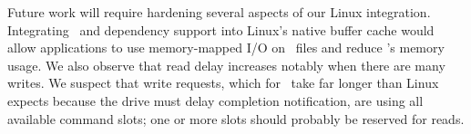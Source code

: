 \begin{comment}
The Linux kernel must be modified in order to
provide support for \patchgroups.  As a kernel module, there is no way to
get notifications about when processes are created, or when they terminate; this
is necessary to clone the \patchgroup\ scope 
from the parent process when the process is created, and to release all
the \patchgroups\ when it terminates. Ordinarily, this sort of state would be kept
as part of the Linux \texttt{task\_struct} (i.e. process) structure, but this is
not a viable option for a dynamically loadable kernel module. Instead, the
\Kudos\ module keeps this state internally and uses new kernel hooks
to be notified when processes fork or exit. 

Our interfaces bypass all Linux caches, because \Kudos\ provides its own
\patch-aware caches (\S\ref{sec:modules:wbcache}) in order to provide its
write-ordering guarantees.

Our current implementation uses Linux's queuing structures for queuing I/O
requests for block devices. Although this is working, there are a couple subtle
problems that we would like to solve in a future version. For instance, we would
like to be able to give more priority to read requests, potentially even
reserving a SCSI TCQ or SATA NCQ command tag for reads only. In the current
implementation, read delay increases noticeably when there are many writes; we
suspect that a factor in this behavior is that the command tags are typically
all used for outstanding writes (since we request that the commands complete
only after the physical media has been written), while the Linux queues are
designed for a different situation: writes complete quickly (to the disk's
cache) and only reads take a long time.
\end{comment}

Future work will require hardening several aspects of our Linux
integration.
%
Integrating \patch\ and dependency support into Linux's native buffer cache
would allow applications to use memory-mapped I/O on \Kudos\ files and
reduce \Kudos's memory usage.
%
We also observe that read delay increases notably when there are many
writes.
%
We suspect that write requests, which for \Kudos\ take far longer than
Linux expects because the drive must delay completion notification, are
using all available command slots; one or more slots should probably be
reserved for reads.
